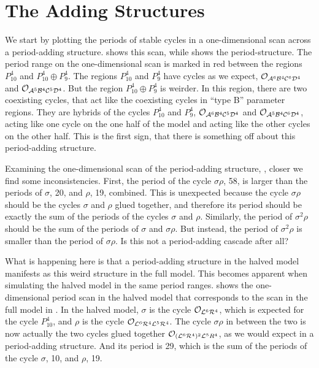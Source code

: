 \section{The Adding Structures}

We start by plotting the periods of stable cycles in a one-dimensional scan across a period-adding structure.
 shows this scan, while  shows the period-structure.
The period range on the one-dimensional scan is marked in red between the regions $P_{10}^4$ and $P_{10}^4 \oplus P_9^4$.
The regions $P_{10}^4$ and $P_9^4$ have cycles as we expect, $\mathcal{O}_{\mathcal{A}^6\mathcal{B}^4\mathcal{C}^6\mathcal{D}^4}$ and $\mathcal{O}_{\mathcal{A}^5\mathcal{B}^4\mathcal{C}^5\mathcal{D}^4}$.
But the region $P_{10}^4 \oplus P_9^4$ is weirder.
In this region, there are two coexisting cycles, that act like the coexisting cycles in ``type B'' parameter regions.
They are hybrids of the cycles $P_{10}^4$ and $P_9^4$, $\mathcal{O}_{\mathcal{A}^6\mathcal{B}^4\mathcal{C}^5\mathcal{D}^4}$ and $\mathcal{O}_{\mathcal{A}^5\mathcal{B}^4\mathcal{C}^6\mathcal{D}^4}$, acting like one cycle on the one half of the model and acting like the other cycles on the other half.
This is the first sign, that there is something off about this period-adding structure.

Examining the one-dimensional scan of the period-adding structure, , closer we find some inconsistencies.
First, the period of the cycle $\sigma\rho$, 58, is larger than the periods of $\sigma$, 20, and $\rho$, 19, combined.
This is unexpected because the cycle $\sigma\rho$ should be the cycles $\sigma$ and $\rho$ glued together, and therefore its period should be exactly the sum of the periods of the cycles $\sigma$ and $\rho$.
Similarly, the period of $\sigma^2\rho$ should be the sum of the periods of $\sigma$ and $\sigma\rho$.
But instead, the period of $\sigma^2\rho$ is smaller than the period of $\sigma\rho$.
Is this not a period-adding cascade after all?

What is happening here is that a period-adding structure in the halved model manifests as this weird structure in the full model.
This becomes apparent when simulating the halved model in the same period ranges.
 shows the one-dimensional period scan in the halved model that corresponds to the scan in the full model in .
In the halved model, $\sigma$ is the cycle $\mathcal{O}_{\mathcal{L}^6\mathcal{R}^4}$, which is expected for the cycle $P_{10}^4$, and $\rho$ is the cycle $\mathcal{O}_{\mathcal{L}^6\mathcal{R}^4\mathcal{L}^5\mathcal{R}^4}$.
The cycle $\sigma\rho$ in between the two is now actually the two cycles glued together $\mathcal{O}_{(\mathcal{L}^6\mathcal{R}^4)^2\mathcal{L}^5R^4}$, as we would expect in a period-adding structure.
And its period is 29, which is the sum of the periods of the cycle $\sigma$, 10, and $\rho$, 19.

